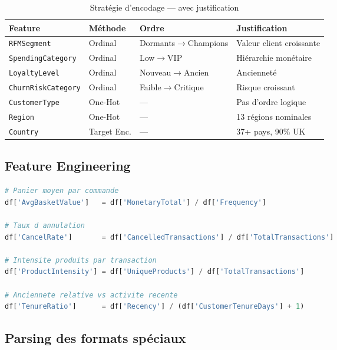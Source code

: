 \documentclass[11pt,a4paper]{article}
\begin{document}
\begin{table}[H]
\centering\small
\caption{Stratégie d'encodage — avec justification}
\begin{tabular}{L{3cm} C{2cm} L{4.5cm} L{4.5cm}}
\toprule
{}
\textbf{Feature} & \textbf{Méthode} & \textbf{Ordre} & \textbf{Justification} \\
\midrule
\texttt{RFMSegment} & Ordinal & Dormants$\to$Champions & Valeur client croissante \\
\texttt{SpendingCategory} & Ordinal & Low$\to$VIP & Hiérarchie monétaire \\
\texttt{LoyaltyLevel} & Ordinal & Nouveau$\to$Ancien & Ancienneté \\
\texttt{ChurnRiskCategory} & Ordinal & Faible$\to$Critique & Risque croissant \\
\texttt{CustomerType} & One-Hot & — & Pas d'ordre logique \\
\texttt{Region} & One-Hot & — & 13 régions nominales \\
\texttt{Country} & Target Enc. & — & 37+ pays, 90\% UK \\
\bottomrule
\end{tabular}
\end{table}

\subsection{Feature Engineering}

\begin{lstlisting}[language=Python, caption=Nouvelles features créées — src/utils.py (PDF §6.1.4)]
# Panier moyen par commande
df['AvgBasketValue']   = df['MonetaryTotal'] / df['Frequency']

# Taux d annulation
df['CancelRate']       = df['CancelledTransactions'] / df['TotalTransactions']

# Intensite produits par transaction
df['ProductIntensity'] = df['UniqueProducts'] / df['TotalTransactions']

# Anciennete relative vs activite recente
df['TenureRatio']      = df['Recency'] / (df['CustomerTenureDays'] + 1)
\end{lstlisting}

\subsection{Parsing des formats spéciaux}
\end{document}
